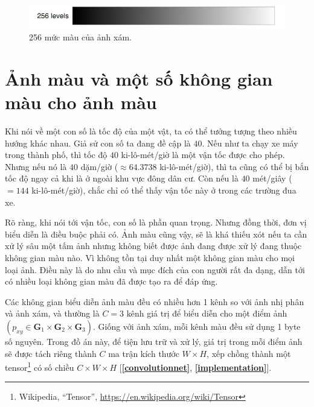 \documentclass[a4paper, 12pt]{report}
\begin{document}
\begin{figure}[!h]
\captionsetup{width=0.8\textwidth}
\centering
\includegraphics[width=14cm]{images/grayscale.PNG}
\caption{256 mức màu của ảnh xám.}
\label{fig:grayscale}
\end{figure}

\section{Ảnh màu và một số không gian màu cho ảnh màu}\label{colorfulimage}

Khi nói về một con số là tốc độ của một vật, ta có thể tưởng tượng theo nhiều hướng khác nhau.
Giả sử con số ta đang đề cập là $40$.
Nếu như ta chạy xe máy trong thành phố, thì tốc độ $40$ ki-lô-mét/giờ là một vận tốc được cho phép.
Nhưng nếu nó là $40$ dặm/giờ ($\approx 64.3738$ ki-lô-mét/giờ), thì ta cũng có thể bị bắn tốc độ ngay cả khi là ở ngoài khu vực đông dân cư.
Còn nếu là $40$ mét/giây ($=144$ ki-lô-mét/giờ), chắc chỉ có thể thấy vận tốc này ở trong các trường đua xe.\vspace{5pt}

Rõ ràng, khi nói tới vận tốc, con số là phần quan trọng.
Nhưng đồng thời, đơn vị biểu diễn là điều buộc phải có.
Ảnh màu cũng vậy, sẽ là khá thiếu xót nếu ta cần xử lý sâu một tấm ảnh nhưng không biết được ảnh đang được xử lý đang thuộc không gian màu nào.
Vì không tồn tại duy nhất một không gian màu \cite{wikicolorspace2021} cho mọi loại ảnh.
Điều này là do nhu cầu và mục đích của con người rất đa dạng, dẫn tới có nhiều loại không gian màu đã được tạo ra để đáp ứng.\vspace{5pt}

Các không gian biểu diễn ảnh màu đều có nhiều hơn 1 kênh so với ảnh nhị phân và ảnh xám, và thường là $C=3$ kênh giá trị để biểu diễn cho một điểm ảnh $\left(p_{xy} \in \bm{G}_{1}\times \bm{G}_{2}\times \bm{G}_{3}\right)$.
Giống với ảnh xám, mỗi kênh màu đều sử dụng 1 byte số nguyên.
Trong đồ án này, để tiện lưu trữ và xử lý, giá trị trong mỗi điểm ảnh sẽ được tách riêng thành $C$ ma trận kích thước $W\times H$, xếp chồng thành một tensor\footnote{Wikipedia, ``Tensor'', \href{https://en.wikipedia.org/wiki/Tensor}{https://en.wikipedia.org/wiki/Tensor}} có số chiều $C\times W \times H$ [\textbf{\ref{convolutionnet}}, \textbf{\ref{implementation}}].
\end{document}
